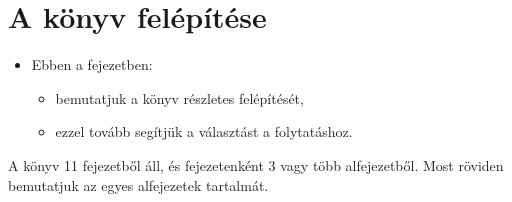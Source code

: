 \documentclass[
]{book}
\providecommand{\tightlist}{%
  \setlength{\itemsep}{0pt}\setlength{\parskip}{0pt}}
\newenvironment{rmdblock}[1]
  {\begin{shaded*}
  \begin{itemize}
  \renewcommand{\labelitemi}{
    \raisebox{-.7\height}[0pt][0pt]{
      {\setkeys{Gin}{width=3em,keepaspectratio}\texttt{[image: images/\#1]}}
    }
  }
  \item
  }
  {
  \end{itemize}
  \end{shaded*}
  }
\newenvironment{rmdlevel2}
  {\begin{rmdblock}{level2}}
  {\end{rmdblock}}
\begin{document}
\hypertarget{a-kuxf6nyv-feluxe9puxedtuxe9se}{%
\section{A könyv felépítése}\label{a-kuxf6nyv-feluxe9puxedtuxe9se}}

\begin{rmdlevel2}
Ebben a fejezetben:

\begin{itemize}
\tightlist
\item
  bemutatjuk a könyv részletes felépítését,
\item
  ezzel tovább segítjük a választást a folytatáshoz.
\end{itemize}
\end{rmdlevel2}

A könyv 11 fejezetből áll, és fejezetenként 3 vagy több alfejezetből. Most röviden bemutatjuk az egyes alfejezetek tartalmát.

\begingroup\fontsize{10}{11}\selectfont
\end{document}
